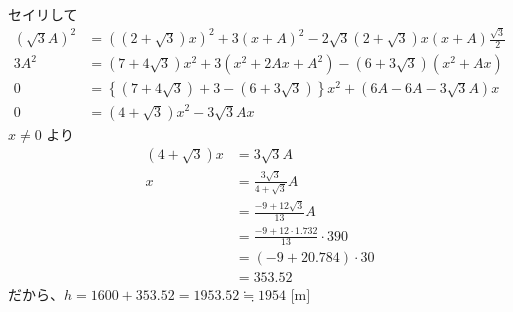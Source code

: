 \documentclass[../main.tex]{subfiles}
\begin{document}
\noindent
セイリして
\begin{align*}
  (\sqrt{3}A)^2 &= \left((2+\sqrt{3})x\right)^2 + 3(x+A)^2 - 2\sqrt{3}(2+\sqrt{3})x(x+A)\frac{\sqrt{3}}{2} \\
  3A^2 &= (7+4\sqrt{3})x^2 + 3(x^2 + 2Ax + A^2) - (6+3\sqrt{3})(x^2 + Ax) \\
  0 &= \left\{(7+4\sqrt{3}) + 3 - (6+3\sqrt{3})\right\}x^2 + (6A - 6A - 3\sqrt{3}A)x \\
  0 &= (4+\sqrt{3})x^2 - 3\sqrt{3}Ax
\end{align*}
$x \neq 0$ より
\begin{align*}
  (4+\sqrt{3})x &= 3\sqrt{3}A \\
  x &= \frac{3\sqrt{3}}{4+\sqrt{3}}A \\
  &= \frac{-9+12\sqrt{3}}{13}A \\
  &= \frac{-9+12\cdot 1.732}{13} \cdot 390 \\
  &= (-9+20.784) \cdot 30 \\
  &= 353.52
\end{align*}
だから、$h = 1600 + 353.52 = 1953.52 \fallingdotseq 1954\text{ [m]}$
\end{document}
